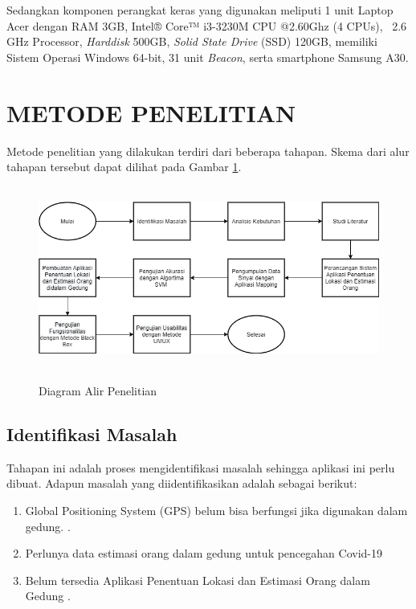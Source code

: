 \par Sedangkan komponen perangkat keras yang digunakan meliputi 1 unit Laptop Acer dengan RAM 3GB, Intel® Core™ i3-3230M CPU @2.60Ghz (4 CPUs), ~2.6 GHz Processor, \textit{Harddisk} 500GB, \textit{Solid State Drive} (SSD) 120GB, memiliki Sistem Operasi Windows 64-bit, 31 unit \textit{Beacon}, serta smartphone Samsung A30.

\section{\uppercase{METODE PENELITIAN}}
Metode penelitian yang dilakukan terdiri dari beberapa tahapan. Skema dari alur tahapan tersebut dapat dilihat pada Gambar \ref{metpen}.
\begin{figure}[H]
	\centering
	{\includegraphics [width = 14cm, height= 6cm]{gambar/metodepenelitian.drawio }}
	\caption{Diagram Alir Penelitian}
	\label{metpen}
\end{figure}

\fancyhf{}
\fancyfoot[R]{\thepage}

\subsection{Identifikasi Masalah}
Tahapan ini adalah proses mengidentifikasi masalah sehingga aplikasi ini perlu dibuat. Adapun masalah yang diidentifikasikan adalah sebagai berikut:
\begin{enumerate}[1.]
	\itemsep0em
	\item Global Positioning System (GPS) belum bisa berfungsi jika digunakan dalam gedung.
	      \citep{Keluza2017}.
	\item Perlunya data estimasi orang dalam gedung untuk pencegahan Covid-19
	\item Belum tersedia Aplikasi Penentuan Lokasi dan Estimasi Orang dalam Gedung .
\end{enumerate}


